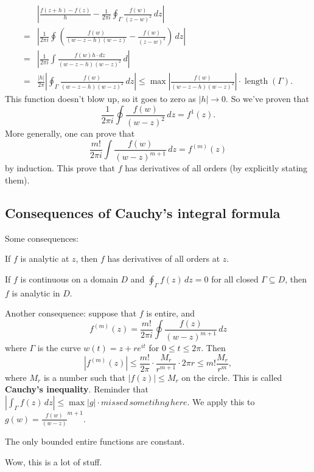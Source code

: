 \begin{align*}
    &\left| \frac{f(z+h)-f(z)}{h}-\frac{1}{2\pi i}\oint_{\Gamma }^{} \frac{f(w)}{(z-w)^2} \, dz \right| \\
    =&\left| \frac{1}{2\pi i}\oint_{}^{} \left( \frac{f(w)}{(w-z-h)(w-z)} - \frac{f(w)}{(z-w)^2} \right)  \, dz\right| \\                                                                     =&\left| \frac{1}{2\pi i}\int \frac{f(w)h\cdot dz}{(w-z-h)(w-z)^2} \, d \right| \\
    =&\frac{|h|}{2\pi}\left| \oint_{\Gamma }^{} \frac{f(w)}{(w-z-h)(w-z)^2} \, dz \right| \leq \operatorname{max}\left| \frac{f(w)}{(w-z-h)(w-z)^2} \right| \cdot \operatorname{length}(\Gamma ).
\end{align*} This function doesn't blow up, so it goes to zero as $|h|\to 0$. So we've proven that \[
\frac{1}{2\pi i}\oint \frac{f(w)}{(w-z)^2} \, dz = f^1(z).
\] More generally, one can prove that \[
\frac{m!}{2\pi i}\int \frac{f(w)}{(w-z)^{m+1}} \, dz=f^{(m)}(z)
\] by induction. This prove that $f$ has derivatives of all orders (by explicitly stating them). 

\subsection{Consequences of Cauchy's integral formula}
Some consequences:
\begin{cor}
    If $f$ is analytic at $z$, then $f$ has derivatives of all orders at $z. $ 
\end{cor}
\begin{cor}
    If $f$ is continuous on a domain $D$ and $\oint_{\Gamma }^{} f(z) \, dz=0$ for all closed $\Gamma \subseteq D$, then $f$ is analytic in $D$.
\end{cor}
\noindent Another consequence: suppose that $f$ is entire, and \[
    f^{(m)}(z)= \frac{m!}{2\pi i}\oint \frac{f(z)}{(w-z)^{m+1}} \, dz
\] where $\Gamma $ is the curve $w(t)=z+re^{it}$ for $0\leq t \leq 2\pi$. Then \[
\left| f^{(m)}(z) \right| \leq \frac{m!}{2\pi}\cdot \frac{M_r}{r^{m+1}}\cdot 2\pi r \leq m! \frac{M_r}{r^m},
\] where $M_r$ is a number such that $|f(z)|\leq M_r$ on the circle. This is called \textbf{Cauchy's inequality}. Reminder that $\left| \int_{\Gamma }^{} f(z) \, dz \right| \leq \operatorname{max}|g|\cdot missed \,sometihng \,here$. We apply this to $g(w)=\frac{f(w)}{(w-z)}^{m+1}$. 
\begin{theorem}\label{liouville}
   The only bounded entire functions are constant. 
\end{theorem}
Wow, this is a lot of stuff.



